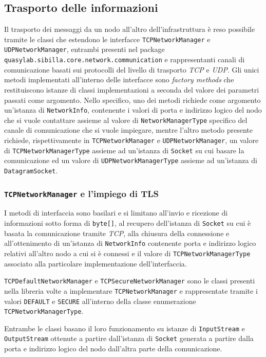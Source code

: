 \subsection{Trasporto delle informazioni}
Il trasporto dei messaggi da un nodo all'altro dell'infrastruttura è reso possibile tramite le classi che estendono le interfacce
\texttt{TCPNetworkManager} e \texttt{UDPNetworkManager}, entrambi presenti nel package \texttt{quasylab.sibilla.core.network.communication} e rappresentanti canali di comunicazione basati sui protocolli
del livello di trasporto \emph{TCP} e \emph{UDP}.
Gli unici metodi implementati all'interno delle interfacce sono \emph{factory methods} che restituiscono istanze di classi implementazioni a seconda del valore dei parametri passati come argomento.
Nello specifico, uno dei metodi richiede come argomento un'istanza di \texttt{NetworkInfo}, contenente
i valori di porta e indirizzo logico del nodo che si vuole contattare assieme al valore di \texttt{NetworkManagerType} specifico del canale di comunicazione che si vuole impiegare, mentre l'altro metodo presente
richiede, rispettivamente in \texttt{TCPNetworkManager} e \texttt{UDPNetworkManager}, un valore di \texttt{TCPNetworkManagerType} assieme ad un'istanza di \texttt{Socket} su cui basare la comunicazione ed un
valore di \texttt{UDPNetworkManagerType} assieme ad un'istanza di \texttt{DatagramSocket}.

\subsubsection{\texttt{TCPNetworkManager} e l'impiego di TLS}
I metodi di interfaccia sono basilari e si limitano all'invio e ricezione di informazioni sotto forma di \texttt{byte[]}, al recupero dell'istanza di \texttt{Socket} su cui è basata la comunicazione tramite \emph{TCP},
alla chiusura della connessione e all'ottenimento di un'istanza di \texttt{NetworkInfo} contenente porta e indirizzo logico relativi all'altro nodo a cui si è connessi e il valore di \texttt{TCPNetworkManagerType} associato alla particolare implementazione dell'interfaccia.

\texttt{TCPDefaultNetworkManager} e \texttt{TCPSecureNetworkManager} sono le classi presenti nella libreria volte a implementare \texttt{TCPNetworkManager} e rappresentate tramite i valori
\texttt{DEFAULT} e \texttt{SECURE} all'interno della classe enumerazione \texttt{TCPNetworkManagerType}.

Entrambe le classi basano il loro funzionamento su istanze di \texttt{InputStream} e \texttt{OutputStream} ottenute a partire dall'istanza di \texttt{Socket} generata a partire dalla porta e indirizzo logico del nodo dall'altra parte della comunicazione.

